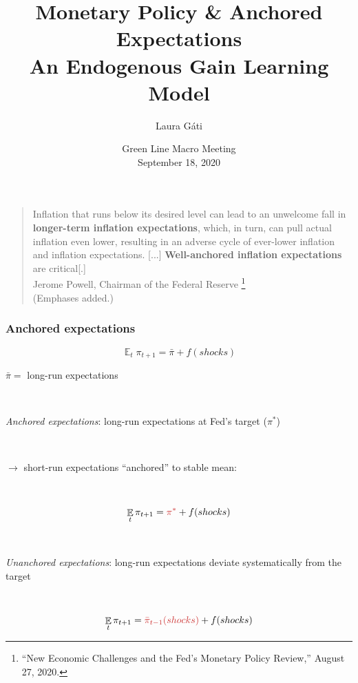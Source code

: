 \documentclass[10pt]{beamer}
\author[]{Laura G\'ati}
\institute[]{Boston College}
\title[]{Monetary Policy \& Anchored Expectations \\
An Endogenous Gain Learning Model}
\date[]{Green Line Macro Meeting \\ \vspace{0.5cm} September 18, 2020}
\DeclareMathOperator{\E}{\mathbb{E}}
\begin{document}
\begin{frame}[plain] %

\maketitle

\end{frame}




\begin{frame}\label{motivation}
	
\begin{quote}
Inflation that runs below its desired level can lead to an unwelcome fall in \textbf{longer-term inflation expectations}, which, in turn, can pull actual inflation even lower, resulting in an adverse cycle of ever-lower inflation and inflation expectations.
[...]  \textbf{Well-anchored inflation expectations} are critical[.]  \\
Jerome Powell, Chairman of the Federal Reserve \footnote{``New Economic Challenges and the Fed's Monetary Policy Review,''  August 27, 2020.} \\
(Emphases added.)
\end{quote}	



\end{frame}

\begin{frame}
\frametitle{Anchored expectations}

\begin{equation}
\E_t \pi_{t+1} = \bar{\pi}+ f(shocks)
\end{equation}

$\bar{\pi} = $ long-run expectations

\

\pause
	
\emph{Anchored expectations}: long-run expectations at Fed's target ($\pi^*$) 

\

\pause

$\rightarrow$ short-run expectations ``anchored'' to stable mean: 


\

\begin{equation}
\E_t \pi_{t+1} = \textcolor{brownreddark}{\pi^*} + f(shocks)
\end{equation}

\

\pause

\emph{Unanchored expectations}: long-run expectations deviate systematically from the target


\

\begin{equation}
\E_t \pi_{t+1} = \textcolor{brownreddark}{\bar{\pi}_{t-1}(shocks)} + f(shocks)
\end{equation}


\end{frame}
\end{document}

